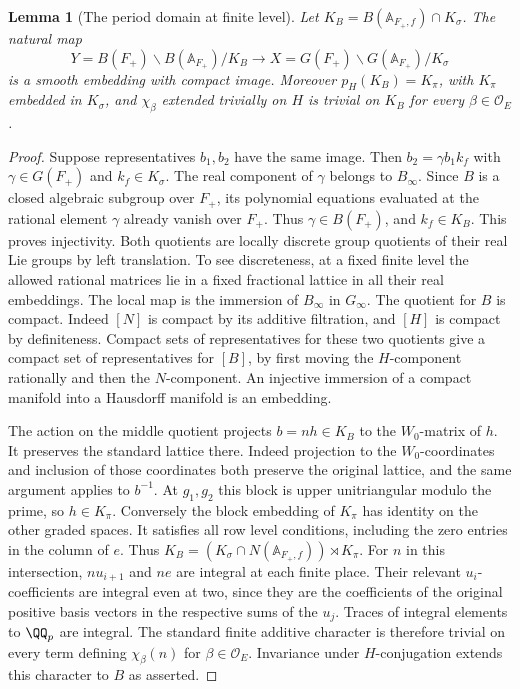 \documentclass[a4paper,11pt]{article}
\newtheorem{lemma}[proposition]{Lemma}
\theoremstyle{definition}
\theoremstyle{remark}
\numberwithin{equation}{section}
\newcommand{\OO}{\mathcal O}
\begin{document}
\begin{lemma}[The period domain at finite level]\label{lem:orbit110}
Let \(K_B=B(\mathbb A_{F_+,f})\cap K_\sigma\).
The natural map
\[
   Y=B(F_+)\backslash B(\mathbb A_{F_+})/K_B
      \longrightarrow
   X=G(F_+)\backslash G(\mathbb A_{F_+})/K_\sigma
\]
is a smooth embedding with compact image.
Moreover \(p_H(K_B)=K_\pi\), with \(K_\pi\) embedded in
\(K_\sigma\), and \(\chi_\beta\) extended trivially on \(H\)
is trivial on \(K_B\) for every \(\beta\in\OO_E\).
\end{lemma}
\begin{proof}
Suppose representatives \(b_1,b_2\) have the same image. Then
\(b_2=\gamma b_1 k_f\) with \(\gamma\in G(F_+)\) and
\(k_f\in K_\sigma\). The real component of \(\gamma\) belongs
to \(B_\infty\). Since \(B\) is a closed algebraic subgroup over
\(F_+\), its polynomial equations evaluated at the rational
element \(\gamma\) already vanish over \(F_+\). Thus
\(\gamma\in B(F_+)\), and \(k_f\in K_B\). This proves injectivity.
Both quotients are locally discrete group quotients of their
real Lie groups by left translation. To see discreteness, at
a fixed finite level the allowed rational matrices lie in a
fixed fractional lattice in all their real embeddings.
The local map is the immersion of \(B_\infty\) in \(G_\infty\).
The quotient for \(B\) is compact. Indeed \([N]\) is compact
by its additive filtration, and \([H]\) is compact by
definiteness. Compact sets of representatives for these two
quotients give a compact set of representatives for \([B]\),
by first moving the \(H\)-component rationally and then the
\(N\)-component. An injective immersion of a compact manifold
into a Hausdorff manifold is an embedding.

The action on the middle quotient projects \(b=nh\in K_B\) to
the \(W_0\)-matrix of \(h\). It preserves the standard lattice
there. Indeed projection to the \(W_0\)-coordinates and inclusion
of those coordinates both preserve the original lattice, and the
same argument applies to \(b^{-1}\). At \(g_1,g_2\) this block
is upper unitriangular modulo the prime, so \(h\in K_\pi\).
Conversely the block embedding of \(K_\pi\) has identity on
the other graded spaces. It satisfies all row level conditions,
including the zero entries in the column of \(e\). Thus
\(K_B=(K_\sigma\cap N(\mathbb A_{F_+,f}))\rtimes K_\pi\).
For \(n\) in this intersection, \(n u_{i+1}\) and \(ne\) are
integral at each finite place. Their relevant \(u_i\)-coefficients
are integral even at two, since they are the coefficients of
the original positive basis vectors in the respective sums of
the \(u_j\). Traces of integral elements to \(\QQ_p\) are
integral. The standard finite additive character is therefore
trivial on every term defining \(\chi_\beta(n)\) for
\(\beta\in\OO_E\). Invariance under \(H\)-conjugation extends
this character to \(B\) as asserted.
\end{proof}
\end{document}
